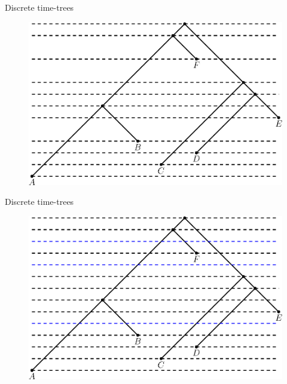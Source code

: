 \documentclass{beamer}
\theoremstyle{example}
\begin{document}
\begin{frame}{Discrete time-trees}
\begin{definition}
\begin{figure}
\centering
\includegraphics[width = \framewidth]{ranked_tree_dashed.eps}
\end{figure}
\end{definition}
\end{frame}

\begin{frame}{Discrete time-trees}
\begin{definition}
\begin{figure}
\centering
\includegraphics[width = \framewidth]{ranked_tree_dashed_time.eps}
\end{figure}
\end{definition}
\end{frame}
\end{document}
